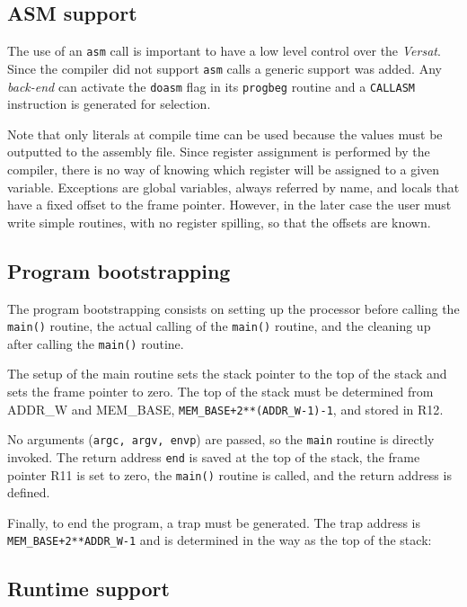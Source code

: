 \documentclass[journal]{IEEEtran}
\begin{document}
\subsection{{ASM} support}

The use of an {\tt asm} call is important to
have a low level control over the {\it Versat}.
Since the compiler did not support {\tt asm} calls
a generic support was
added.
Any {\it back-end} can activate the {\tt doasm} flag
in its {\tt progbeg} routine and a {\tt CALLASM}
instruction is generated for selection.

Note that only literals at compile time can be used
because the values must be outputted to the assembly file.
Since register assignment is performed by the compiler,
there is no way of knowing which register will be
assigned to a given variable.
Exceptions are global variables, always referred by name,
and locals that have a fixed offset to the frame pointer.
However, in the later case the user must write simple
routines, with no register spilling, so that the offsets
are known.

\subsection{Program bootstrapping}\label{boot}

The program bootstrapping consists on setting up the
processor before calling the {\tt main()} routine, the
actual calling of the {\tt main()} routine, and the
cleaning up after calling the {\tt main()} routine.

The setup of the main routine sets the stack pointer to
the top of the stack and sets the frame pointer to zero.
The top of the stack must be determined from {\sc ADDR\_W}
and {\sc MEM\_BASE}, {\tt MEM\_BASE+2**(ADDR\_W-1)-1},
and stored in {\sc R12}.

No arguments ({\tt argc, argv, envp}) are passed, so the
{\tt main} routine is directly invoked.
The return address {\tt end} is saved at the top of the
stack, the frame pointer {\sc R11} is set to zero, the
{\tt main()} routine is called, and the return address is
defined.

Finally, to end the program, a trap must be generated.
The trap address is {\tt MEM\_BASE+2**ADDR\_W-1} and is
determined in the way as the top of the stack:

\subsection{Runtime support}
\end{document}
